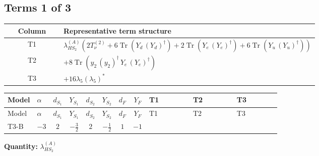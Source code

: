 \documentclass[8pt]{article}
\begin{document}
\begin{landscape}
\subsection*{Terms 1 of 3}
\begin{center}
\begin{tabular}{@{}c >{\raggedright\arraybackslash}p{0.82\linewidth}@{}}
\toprule
Column & Representative term structure \\
\midrule
T1 & \(\displaystyle {\lambda_{HS_2}^{(A)}} (2 T_{\nu}^{(2)}+6 \operatorname{Tr}\!\left({Y_d}\,\left({Y_d}\right)^{\dagger}\right)+2 \operatorname{Tr}\!\left({Y_e}\,\left({Y_e}\right)^{\dagger}\right)+6 \operatorname{Tr}\!\left({Y_u}\,\left({Y_u}\right)^{\dagger}\right))\) \\
\midrule
T2 & \(\displaystyle +8 \operatorname{Tr}\!\left({y_2}\,\left({y_2}\right)^{\dagger}\,{Y_e}\,\left({Y_e}\right)^{\dagger}\right)\) \\
\midrule
T3 & \(\displaystyle +16 {\lambda_5} \left({\lambda_5}\right)^{*}\) \\
\midrule
\bottomrule
\end{tabular}
\end{center}
\smallskip
\tiny
\begin{longtable}{@{}llcccccc >{\raggedright\arraybackslash}p{0.21\linewidth} >{\raggedright\arraybackslash}p{0.21\linewidth} >{\raggedright\arraybackslash}p{0.21\linewidth}@{}}
\toprule
Model & $\alpha$ & $d_{S_1}$ & $Y_{S_1}$ & $d_{S_2}$ & $Y_{S_2}$ & $d_F$ & $Y_F$ & T1 & T2 & T3 \\
\midrule
\endfirsthead
\toprule
Model & $\alpha$ & $d_{S_1}$ & $Y_{S_1}$ & $d_{S_2}$ & $Y_{S_2}$ & $d_F$ & $Y_F$ & T1 & T2 & T3 \\
\midrule
\endhead
T3-B & $-3$ & $2$ & $-\frac{3}{2}$ & $2$ & $-\frac{1}{2}$ & $1$ & $-1$ & \scriptsize\adjustbox{max width=\linewidth}{$\begin{gathered} {\lambda_{HS_2}^{(A)}} (2 T_{\nu}^{(2)}+6 \operatorname{Tr}\!\left({Y_d}\,\left({Y_d}\right)^{\dagger}\right)+2 \operatorname{Tr}\!\left({Y_e}\,\left({Y_e}\right)^{\dagger}\right)+6 \operatorname{Tr}\!\left({Y_u}\,\left({Y_u}\right)^{\dagger}\right))\end{gathered}$} & \scriptsize\adjustbox{max width=\linewidth}{$\begin{gathered} +8 \operatorname{Tr}\!\left({y_2}\,\left({y_2}\right)^{\dagger}\,{Y_e}\,\left({Y_e}\right)^{\dagger}\right)\end{gathered}$} & \scriptsize\adjustbox{max width=\linewidth}{$\begin{gathered} +16 {\lambda_5} \left({\lambda_5}\right)^{*}\end{gathered}$} \\
\midrule
\bottomrule
\end{longtable}
\clearpage
\noindent\textbf{Quantity: }$\lambda_{HS_2}^{(A)}$\par\smallskip

\end{landscape}
\end{document}

